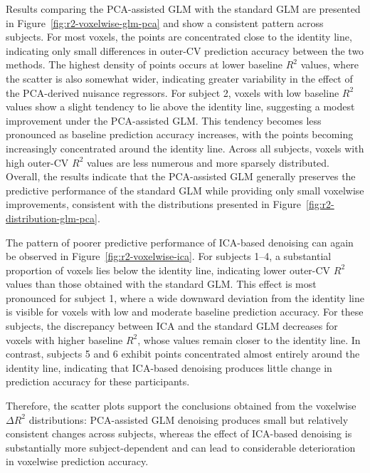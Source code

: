 \documentclass[english]{pwr_wmat_praca_dyplomowa}
\theoremstyle{definition}
\theoremstyle{remark}
\begin{document}
Results comparing the PCA-assisted GLM with the standard GLM are presented in Figure~\ref{fig:r2-voxelwise-glm-pca} and show a consistent pattern across subjects. For most voxels, the points are concentrated close to the identity line, indicating only small differences in outer-CV prediction accuracy between the two methods. The highest density of points occurs at lower baseline $R^2$ values, where the scatter is also somewhat wider, indicating greater variability in the effect of the PCA-derived nuisance regressors. For subject 2, voxels with low baseline $R^2$ values show a slight tendency to lie above the identity line, suggesting a modest improvement under the PCA-assisted GLM. This tendency becomes less pronounced as baseline prediction accuracy increases, with the points becoming increasingly concentrated around the identity line. Across all subjects, voxels with high outer-CV $R^2$ values are less numerous and more sparsely distributed. Overall, the results indicate that the PCA-assisted GLM generally preserves the predictive performance of the standard GLM while providing only small voxelwise improvements, consistent with the distributions presented in Figure~\ref{fig:r2-distribution-glm-pca}.

\newpage
The pattern of poorer predictive performance of ICA-based denoising can again be observed in Figure~\ref{fig:r2-voxelwise-ica}. For subjects 1--4, a substantial proportion of voxels lies below the identity line, indicating lower outer-CV $R^2$ values than those obtained with the standard GLM. This effect is most pronounced for subject 1, where a wide downward deviation from the identity line is visible for voxels with low and moderate baseline prediction accuracy. For these subjects, the discrepancy between ICA and the standard GLM decreases for voxels with higher baseline $R^2$, whose values remain closer to the identity line. In contrast, subjects 5 and 6 exhibit points concentrated almost entirely around the identity line, indicating that ICA-based denoising produces little change in prediction accuracy for these participants.

Therefore, the scatter plots support the conclusions obtained from the voxelwise $\Delta R^2$ distributions: PCA-assisted GLM denoising produces small but relatively consistent changes across subjects, whereas the effect of ICA-based denoising is substantially more subject-dependent and can lead to considerable deterioration in voxelwise prediction accuracy.
\end{document}

